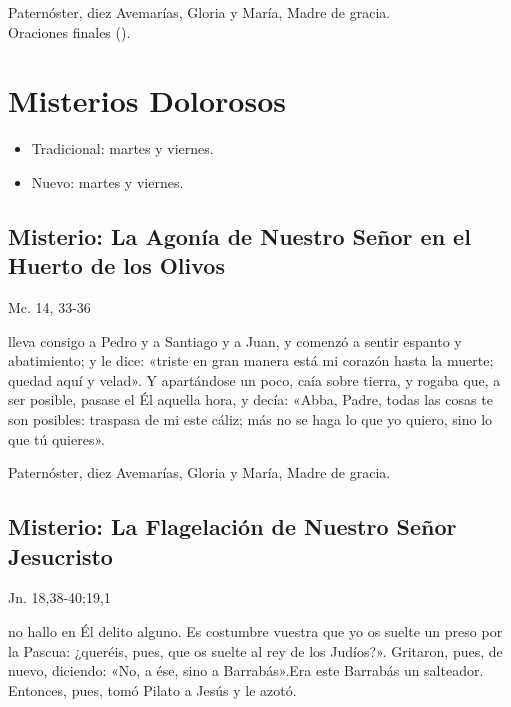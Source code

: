 \documentclass[./main.tex]{subfiles}
\newcounter{sorrowful-counter}
\begin{document}
\begin{center}
      Paternóster, diez Avemarías, Gloria y María, Madre de gracia.\\
      Oraciones finales ().
\end{center}

\section*{Misterios Dolorosos}
\begin{itemize}
      \item Tradicional: martes y viernes.
      \item Nuevo: martes y viernes.
\end{itemize}

\subsection*{ Misterio: La Agonía de Nuestro Señor en el Huerto de los Olivos}
\begin{flushright}
      {\color{red}Mc. 14, 33-36}
\end{flushright}
 lleva consigo a Pedro y a Santiago y a Juan, y comenzó a sentir espanto y abatimiento; y le dice: «triste en gran manera está mi corazón hasta la muerte; 
quedad aquí y velad». Y apartándose un poco, caía sobre tierra, y rogaba que, a ser posible, pasase el Él aquella hora, y decía: «Abba, Padre, todas las cosas te son posibles: 
traspasa de mi este cáliz; más no se haga lo que yo quiero, sino lo que tú quieres».

\begin{center}
      Paternóster, diez Avemarías, Gloria y María, Madre de gracia.
\end{center}

\subsection*{ Misterio: La Flagelación de Nuestro Señor Jesucristo}
\begin{flushright}
      {\color{red}Jn. 18,38-40;19,1}
\end{flushright}
 no hallo en Él delito alguno. Es costumbre vuestra que yo os suelte un preso por la Pascua: ¿queréis, pues, que os suelte al rey de los Judíos?». 
Gritaron, pues, de nuevo, diciendo: «No, a ése, sino a Barrabás».Era este Barrabás un salteador. Entonces, pues, tomó Pilato a Jesús y le azotó.
\end{document}
